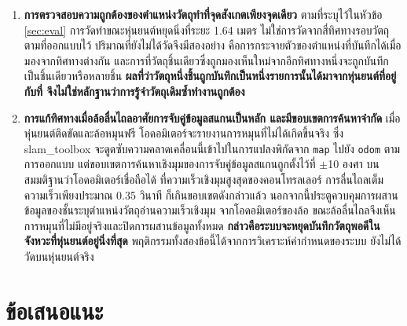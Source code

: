 \documentclass[a4paper,12pt]{report}
\begin{document}
\begin{enumerate}[label=\arabic*., leftmargin=1.25cm, itemsep=6pt, topsep=6pt]
    \item \textbf{การตรวจสอบความถูกต้องของตำแหน่งวัตถุทำที่จุดสังเกตเพียงจุดเดียว}
    ตามที่ระบุไว้ในหัวข้อ \ref{sec:eval} การวัดทำขณะหุ่นยนต์หยุดนิ่งที่ระยะ 1.64 เมตร
    ไม่ใช่การวัดจากสี่ทิศทางรอบวัตถุตามที่ออกแบบไว้
    ปริมาณที่ยังไม่ได้วัดจึงมีสองอย่าง คือการกระจายตัวของตำแหน่งที่บันทึกได้เมื่อมองจากทิศทางต่างกัน
    และการที่วัตถุชิ้นเดียวซึ่งถูกมองเห็นใหม่จากอีกทิศทางหนึ่งจะถูกบันทึกเป็นชิ้นเดียวหรือหลายชิ้น
    \textbf{ผลที่ว่าวัตถุหนึ่งชิ้นถูกบันทึกเป็นหนึ่งรายการนั้นได้มาจากหุ่นยนต์ที่อยู่กับที่
    จึงไม่ใช่หลักฐานว่าการรู้จำวัตถุเดิมซ้ำทำงานถูกต้อง}

    \item \textbf{การแก้ทิศทางเมื่อล้อลื่นไถลอาศัยการจับคู่ข้อมูลสแกนเป็นหลัก
    และมีขอบเขตการค้นหาจำกัด} เมื่อหุ่นยนต์ติดขัดและล้อหมุนฟรี
    โอดอมิเตอร์จะรายงานการหมุนที่ไม่ได้เกิดขึ้นจริง
    ซึ่ง slam\_toolbox จะดูดซับความคลาดเคลื่อนนี้เข้าไปในการแปลงพิกัดจาก
    \texttt{map} ไปยัง \texttt{odom} ตามการออกแบบ
    แต่ขอบเขตการค้นหาเชิงมุมของการจับคู่ข้อมูลสแกนถูกตั้งไว้ที่ $\pm$10 องศา
    บนสมมติฐานว่าโอดอมิเตอร์เชื่อถือได้
    ที่ความเร็วเชิงมุมสูงสุดของคอนโทรลเลอร์ การลื่นไถลเต็มความเร็วเพียงประมาณ 0.35 วินาที
    ก็เกินขอบเขตดังกล่าวแล้ว
    นอกจากนี้ประตูควบคุมการผสานข้อมูลของชั้นระบุตำแหน่งวัตถุอ่านความเร็วเชิงมุม
    จากโอดอมิเตอร์ของล้อ ขณะล้อลื่นไถลจึงเห็นการหมุนที่ไม่มีอยู่จริงและปิดการผสานข้อมูลทั้งหมด
    \textbf{กล่าวคือระบบจะหยุดบันทึกวัตถุพอดีในจังหวะที่หุ่นยนต์อยู่นิ่งที่สุด}
    พฤติกรรมทั้งสองข้อนี้ได้จากการวิเคราะห์ค่ากำหนดของระบบ ยังไม่ได้วัดบนหุ่นยนต์จริง
\end{enumerate}


\section{ข้อเสนอแนะ}
\end{document}
